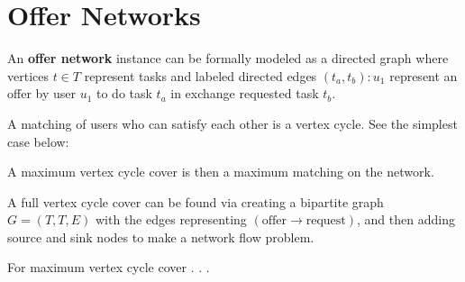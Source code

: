 \documentclass[main.tex]{subfiles}
\begin{document}
\section{Offer Networks}
An \textbf{offer network} instance can be formally modeled as a directed graph where vertices $t \in T$ represent tasks and labeled directed edges $(t_a,t_b) : u_1$ represent an offer by user $u_1$ to do task $t_a$ in exchange requested task $t_b$.
\begin{center}
\end{center}

A matching of users who can satisfy each other is a vertex cycle. See the simplest case below:

\begin{center}
\end{center}

A maximum vertex cycle cover is then a maximum matching on the network.

A full vertex cycle cover can be found via creating a bipartite graph $G = (T,T, E)$ with the edges representing $(\mbox{offer} \to \mbox{request})$, and then adding source and sink nodes to make a network flow problem.

For maximum vertex cycle cover . . .
\end{document}
